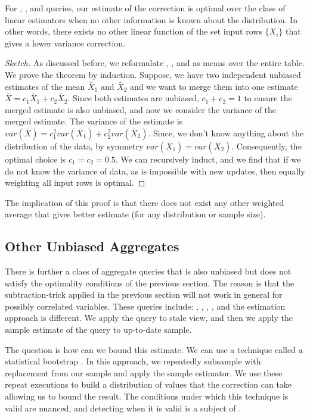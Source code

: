 \begin{theorem}
For \sumfunc, \countfunc, and \avgfunc queries, our estimate of the correction is optimal over the class of linear estimators when no other information is known about the distribution. 
In other words, there exists no other linear function of the set input rows $\{ X_i \}$ that gives a lower variance correction.
\end{theorem}
\begin{proof}[Sketch]
As discussed before, we reformulate \sumfunc, \countfunc, and \avgfunc as means over the entire table. We prove the theorem by induction. 
Suppose, we have two independent unbiased estimates of the mean $\bar{X}_1$ and $\bar{X}_2$ and we want to merge them into one estimate $\bar{X} = c_1\bar{X}_1+c_2\bar{X}_2$.
Since both estimates are unbiased, $c_1 + c_2 = 1$ to ensure the merged estimate is also unbiased, and now we consider the variance of the merged estimate.
The variance of the estimate is $var(\bar{X}) = c_1^2var(\bar{X}_1) + c_2^2var(\bar{X}_2)$.
Since, we don't know anything about the distribution of the data, by symmetry $var(\bar{X}_1) = var(\bar{X}_2)$.
Consequently, the optimal choice is $c_1=c_2=0.5$. 
We can recursively induct, and we find that if we do not know the variance of data, as is impossible with new updates, then equally weighting all input rows is optimal. 
\end{proof}
The implication of this proof is that there does not exist any other weighted average that gives better estimate (for any distribution or sample size).

\subsection{Other Unbiased Aggregates}
There is further a class of aggregate queries that is also unbiased but does not satisfy the optimality conditions of the previous section.
The reason is that the subtraction-trick applied in the previous section will not work in general for possibly correlated variables.
These queries include: \histfunc, \corrfunc, \varfunc, \covfunc, and the estimation approach is different.
We apply the query to stale view, and then we apply the sample estimate of the query to up-to-date sample.

The question is how can we bound this estimate.
We can use a technique called a statistical bootstrap \cite{AgarwalMPMMS13}.
In this approach, we repeatedly subsample with replacement from our sample and apply the sample estimator.
We use these repeat executions to build a distribution of values that the correction can take allowing us to bound the result.
The conditions under which this technique is valid are nuanced, and detecting when it is valid is a subject of \cite{agarwalknowing}.

